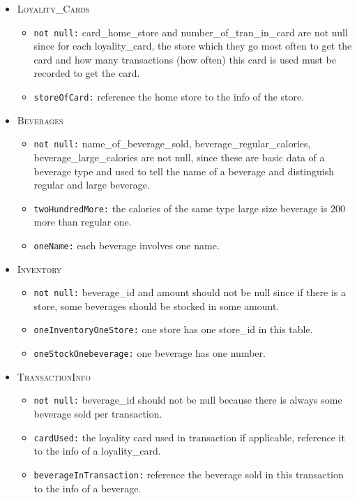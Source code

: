 \documentclass[10pt]{article}
\begin{document}
\begin{enumerate}
\begin{enumerate}
\begin{mdframed}[leftmargin=-6.5mm]
\begin{itemize}
            \item \textsc{Loyality\_Cards}
             \begin{itemize}
                 \item \texttt{not null:} card\_home\_store and number\_of\_tran\_in\_card are not null since for each loyality\_card, the store which they go most often to get the card and how many transactions (how often) this card is used must be recorded to get the card.
                 \item \texttt{storeOfCard:} reference the home store to the info of the store.
             \end{itemize}
             
            \item \textsc{Beverages}
            \begin{itemize}
                \item \texttt{not null:} name\_of\_beverage\_sold, beverage\_regular\_calories, beverage\_large\_calories are not null, since these are basic data of a beverage type and used to tell the name of a beverage and distinguish regular and large beverage.
                \item \texttt{twoHundredMore:} the calories of the same type large size beverage is 200 more than regular one.
                \item \texttt{oneName:} each beverage involves one name.
            \end{itemize}
            
            \item \textsc{Inventory}
            \begin{itemize}
                \item \texttt{not null:} beverage\_id and amount should not be null since if there is a store, some beverages should be stocked in some amount.
                \item \texttt{oneInventoryOneStore:} one store has one store\_id in this table.
                \item \texttt{oneStockOnebeverage:} one beverage has one number.
            \end{itemize}
            
            \item \textsc{TransactionInfo}
            \begin{itemize}
                \item \texttt{not null:} beverage\_id should not be null because there is always some beverage sold per transaction.
                \item \texttt{cardUsed:} the loyality card used in transaction if applicable, reference it to the info of a loyality\_card.
                \item \texttt{beverageInTransaction:} reference the beverage sold in this transaction to the info of a beverage.
            \end{itemize}
            

\end{itemize}
\end{mdframed}
\end{enumerate}
\end{enumerate}
\end{document}

